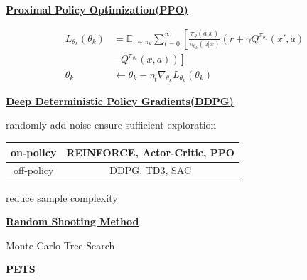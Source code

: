 \documentclass[landscape,a0paper,fontscale=0.285]{baposter} %
\begin{document}
\begin{poster}
{\underline{\textbf{Proximal Policy Optimization(PPO)}}

$$
\begin{aligned}
L_{\theta_k}(\theta_k) &= \mathbb E_{\tau \sim \pi_k}\sum_{t=0}^\infty \left[\frac{\pi_\theta(a|x)}{\pi_{\theta_k}(a|x)}\left(r + \gamma Q^{\pi_{\theta_k}}(x',a)\right.\right.\\
&\left.\left.-Q^{\pi_{\theta_k}}(x,a)\right)\right]
\\
\theta_k &\leftarrow \theta_k - \eta_t \nabla_{\theta_k}L_{
\theta_k}(\theta_k)
\end{aligned}
$$

\underline{\textbf{Deep Deterministic Policy Gradients(DDPG)}}

randomly add noise ensure sufficient  exploration

\begin{tabular}{|c|c|}
    \hline
     on-policy &  REINFORCE, Actor-Critic, PPO \\
     \hline
     off-policy&  DDPG, TD3, SAC\\
     \hline
\end{tabular}

\colorbox[HTML]{CCFFFF}{}

reduce sample complexity

\underline{\textbf{Random Shooting Method}}

Monte Carlo Tree Search

\underline{\textbf{PETS}}

}
\end{poster}
\end{document}
